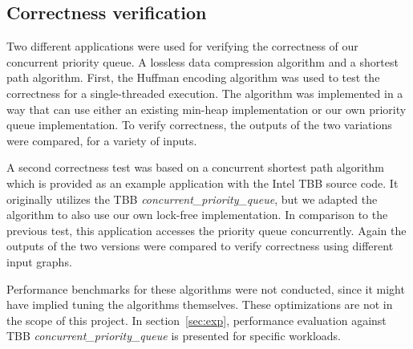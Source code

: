 \subsection{Correctness verification}
\label{subsec:corr_ver}
Two different applications were used for verifying the correctness of our concurrent priority queue.
A lossless data compression algorithm and a shortest path algorithm. 
First, the Huffman encoding algorithm was used to test the correctness for a single-threaded execution. The algorithm was implemented in a way that can use either an existing min-heap implementation or our own priority queue implementation.
To verify correctness, the outputs of the two variations were compared, for a variety of inputs.

A second correctness test was based on a concurrent shortest path algorithm which is provided as an example application with the Intel TBB source code.
It originally utilizes the TBB \textit{concurrent\_priority\_queue}, but we adapted the algorithm to also use our own lock-free implementation.
In comparison to the previous test, this application accesses the priority queue concurrently.
Again the outputs of the two versions were compared to verify correctness using different input graphs.

Performance benchmarks for these algorithms were not conducted, since it might have implied tuning the algorithms themselves.
These optimizations are not in the scope of this project.
In section~\ref{sec:exp}, performance evaluation against TBB \textit{concurrent\_priority\_queue} is presented for specific workloads.

